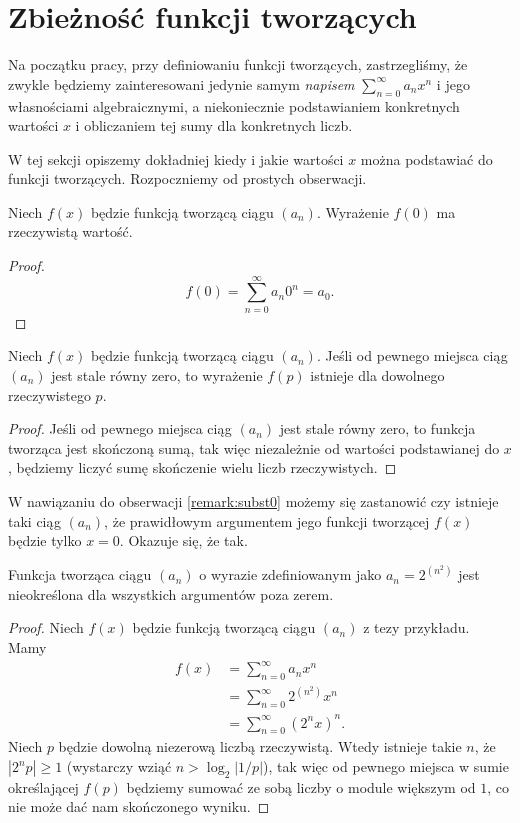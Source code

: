 \documentclass[shortabstract]{imthesis}
\begin{document}
\section{Zbieżność funkcji tworzących} \label{section:convergence}

Na początku pracy, przy definiowaniu funkcji tworzących, zastrzegliśmy, że zwykle będziemy zainteresowani jedynie samym \emph{napisem} $\sum_{n=0}^\infty a_nx^n$ i jego własnościami algebraicznymi, a niekoniecznie podstawianiem konkretnych wartości $x$ i obliczaniem tej sumy dla konkretnych liczb.

W tej sekcji opiszemy dokładniej kiedy i jakie wartości $x$ można podstawiać do funkcji tworzących. Rozpoczniemy od prostych obserwacji.

\begin{remark} \label{remark:subst0}
    Niech $f(x)$ będzie funkcją tworzącą ciągu $(a_n)$. Wyrażenie $f(0)$ ma rzeczywistą wartość.
\end{remark}
\begin{proof}
    $$f(0) = \sum_{n=0}^\infty a_n 0^n = a_0.$$
\end{proof}

\begin{remark}
    Niech $f(x)$ będzie funkcją tworzącą ciągu $(a_n)$. Jeśli od pewnego miejsca ciąg $(a_n)$ jest stale równy zero, to wyrażenie $f(p)$ istnieje dla dowolnego rzeczywistego $p$.
\end{remark}
\begin{proof}
    Jeśli od pewnego miejsca ciąg $(a_n)$ jest stale równy zero, to funkcja tworząca jest skończoną sumą, tak więc niezależnie od wartości podstawianej do $x$, będziemy liczyć sumę skończenie wielu liczb rzeczywistych.
\end{proof}

W nawiązaniu do obserwacji \ref{remark:subst0} możemy się zastanowić czy istnieje taki ciąg $(a_n)$, że prawidłowym argumentem jego funkcji tworzącej $f(x)$ będzie tylko $x = 0$. Okazuje się, że tak.

\begin{example}
    Funkcja tworząca ciągu $(a_n)$ o wyrazie zdefiniowanym jako $a_n = 2^{(n^2)}$ jest nieokreślona dla wszystkich argumentów poza zerem.
\end{example}
\begin{proof}
    Niech $f(x)$ będzie funkcją tworzącą ciągu $(a_n)$ z tezy przykładu. Mamy
    \begin{align*}
        f(x) &= \sum_{n=0}^\infty a_nx^n \\
        &= \sum_{n=0}^\infty 2^{(n^2)}x^n \\
        &= \sum_{n=0}^\infty \left(2^nx\right)^n.
    \end{align*}
    Niech $p$ będzie dowolną niezerową liczbą rzeczywistą. Wtedy istnieje takie $n$, że $|2^np| \geq 1$ (wystarczy wziąć $n > \log_2 |1/p|$), tak więc od pewnego miejsca w sumie określającej $f(p)$ będziemy sumować ze sobą liczby o module większym od $1$, co nie może dać nam skończonego wyniku. 
\end{proof}
\end{document}
